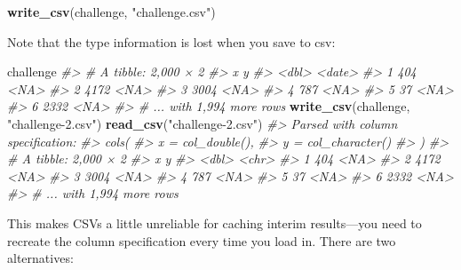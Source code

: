 \documentclass[]{book}
\newenvironment{Shaded}{\begin{snugshade}}{\end{snugshade}}
\newcommand{\KeywordTok}[1]{\textcolor[rgb]{0.13,0.29,0.53}{\textbf{{#1}}}}
\newcommand{\StringTok}[1]{\textcolor[rgb]{0.31,0.60,0.02}{{#1}}}
\newcommand{\CommentTok}[1]{\textcolor[rgb]{0.56,0.35,0.01}{\textit{{#1}}}}
\newcommand{\NormalTok}[1]{{#1}}
\begin{document}
\begin{Shaded}
\begin{Highlighting}[]
\KeywordTok{write_csv}\NormalTok{(challenge, }\StringTok{"challenge.csv"}\NormalTok{)}
\end{Highlighting}
\end{Shaded}

Note that the type information is lost when you save to csv:

\begin{Shaded}
\begin{Highlighting}[]
\NormalTok{challenge}
\CommentTok{#> # A tibble: 2,000 × 2}
\CommentTok{#>       x      y}
\CommentTok{#>   <dbl> <date>}
\CommentTok{#> 1   404   <NA>}
\CommentTok{#> 2  4172   <NA>}
\CommentTok{#> 3  3004   <NA>}
\CommentTok{#> 4   787   <NA>}
\CommentTok{#> 5    37   <NA>}
\CommentTok{#> 6  2332   <NA>}
\CommentTok{#> # ... with 1,994 more rows}
\KeywordTok{write_csv}\NormalTok{(challenge, }\StringTok{"challenge-2.csv"}\NormalTok{)}
\KeywordTok{read_csv}\NormalTok{(}\StringTok{"challenge-2.csv"}\NormalTok{)}
\CommentTok{#> Parsed with column specification:}
\CommentTok{#> cols(}
\CommentTok{#>   x = col_double(),}
\CommentTok{#>   y = col_character()}
\CommentTok{#> )}
\CommentTok{#> # A tibble: 2,000 × 2}
\CommentTok{#>       x     y}
\CommentTok{#>   <dbl> <chr>}
\CommentTok{#> 1   404  <NA>}
\CommentTok{#> 2  4172  <NA>}
\CommentTok{#> 3  3004  <NA>}
\CommentTok{#> 4   787  <NA>}
\CommentTok{#> 5    37  <NA>}
\CommentTok{#> 6  2332  <NA>}
\CommentTok{#> # ... with 1,994 more rows}
\end{Highlighting}
\end{Shaded}

This makes CSVs a little unreliable for caching interim results---you
need to recreate the column specification every time you load in. There
are two alternatives:
\end{document}
